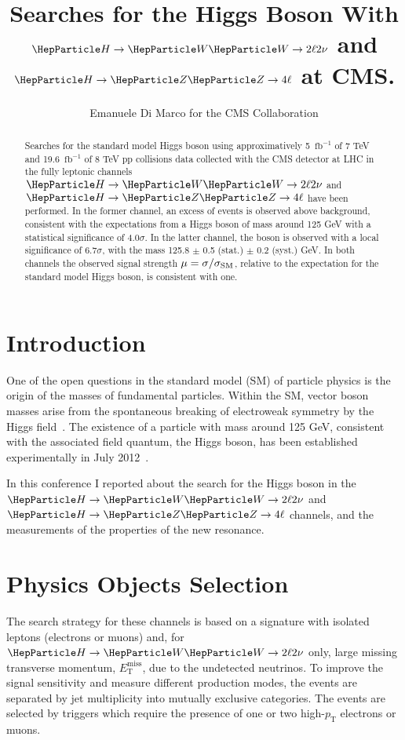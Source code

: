 \documentclass{cimento}
\title{Searches for the Higgs Boson With $\hwwtl$ and $\hzzfl$ at CMS.}
\author{Emanuele Di Marco for the CMS Collaboration}
\newcommand{\fbinv} {\mbox{\ensuremath{\,\text{fb}^\text{$-$1}}}\xspace}
\newcommand{\cPZ}{\PZ} %
\newcommand{\pt}{\ensuremath{p_{\mathrm{T}}}\xspace}
\newcommand{\ETm}{\ensuremath{E_{\mathrm{T}}^{\text{miss}}}\xspace}
\newcommand{\hzzfl}{\ensuremath{\PH\to\cPZ\cPZ\to4\ell}}
\newcommand{\hwwtl}{\ensuremath{\PH\to\PW\PW\to2\ell2\nu}}
\begin{document}
\maketitle

\begin{abstract}
Searches for the standard model Higgs boson using approximatively
5 \fbinv of 7 TeV and 19.6 \fbinv of 8 TeV pp collisions data
collected with the CMS detector at LHC in the fully leptonic channels
$\hwwtl$ and $\hzzfl$ have been performed.  In the former channel, an
excess of events is observed above background, consistent with the
expectations from a Higgs boson of mass around 125 GeV with a
statistical significance of 4.0$\sigma$.  In the latter channel, the
boson is observed with a local significance of 6.7$\sigma$, with the
mass 125.8 $\pm$ 0.5 (stat.) $\pm$ 0.2 (syst.) GeV. In both channels
the observed signal strength $\mu=\sigma/\sigma_{\rm SM}$, relative to
the expectation for the standard model Higgs boson, is consistent with
one.
\end{abstract}

%
%

\section{Introduction}

One of the open questions in the standard model (SM) of particle
physics is the origin of the masses of fundamental particles. Within
the SM, vector boson masses arise from the spontaneous breaking of
electroweak symmetry by the Higgs field~\cite{Higgs1, Higgs2}.  The
existence of a particle with mass around 125 GeV, consistent with the
associated field quantum, the Higgs boson, has been established
experimentally in July 2012~\cite{Chatrchyan:2012ufa,Aad:2012tfa}.

In this conference I reported about the search for the Higgs boson in
the $\hwwtl$ and $\hzzfl$ channels, and the measurements of the
properties of the new resonance.

\section{Physics Objects Selection}

The search strategy for these channels is based on a signature with
isolated leptons (electrons or muons) and, for $\hwwtl$ only, large
missing transverse momentum, $\ETm$, due to the undetected
neutrinos. To improve the signal sensitivity and measure different
production modes, the events are separated by jet multiplicity into
mutually exclusive categories.  The events are selected by triggers
which require the presence of one or two high-$\pt$ electrons or
muons.
\end{document}
